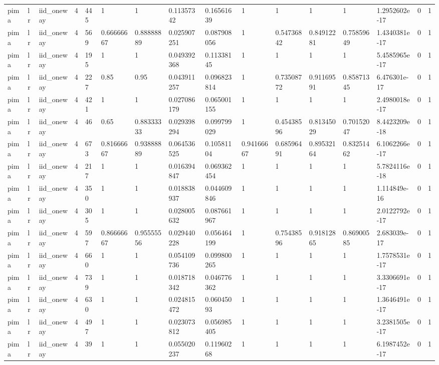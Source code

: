 \begin{tabular}{llllllllllllllll}
pima & lr & iid\_oneway & 4 & 445 & 1 & 1 & 0.11357342 & 0.16561639 & 1 & 1 & 1 & 1 & 1.2952602e-17 & 0 & 1 \\
pima & lr & iid\_oneway & 4 & 569 & 0.66666667 & 0.88888889 & 0.025907251 & 0.087908056 & 1 & 0.54736842 & 0.84912281 & 0.75859649 & 1.4340381e-17 & 0 & 1 \\
pima & lr & iid\_oneway & 4 & 195 & 1 & 1 & 0.049392368 & 0.11338145 & 1 & 1 & 1 & 1 & 5.4585965e-17 & 0 & 1 \\
pima & lr & iid\_oneway & 4 & 227 & 0.85 & 0.95 & 0.043911257 & 0.096823814 & 1 & 0.73508772 & 0.91169591 & 0.85871345 & 6.476301e-17 & 0 & 1 \\
pima & lr & iid\_oneway & 4 & 421 & 1 & 1 & 0.027086179 & 0.065001155 & 1 & 1 & 1 & 1 & 2.4980018e-17 & 0 & 1 \\
pima & lr & iid\_oneway & 4 & 46 & 0.65 & 0.88333333 & 0.029398294 & 0.099799029 & 1 & 0.45438596 & 0.81345029 & 0.70152047 & 8.4423209e-18 & 0 & 1 \\
pima & lr & iid\_oneway & 4 & 673 & 0.81666667 & 0.93888889 & 0.064536525 & 0.10581104 & 0.94166667 & 0.68596491 & 0.89532164 & 0.83251462 & 6.1062266e-17 & 0 & 1 \\
pima & lr & iid\_oneway & 4 & 217 & 1 & 1 & 0.016394847 & 0.069362454 & 1 & 1 & 1 & 1 & 5.7824116e-18 & 0 & 1 \\
pima & lr & iid\_oneway & 4 & 350 & 1 & 1 & 0.018838937 & 0.044609846 & 1 & 1 & 1 & 1 & 1.114849e-16 & 0 & 1 \\
pima & lr & iid\_oneway & 4 & 305 & 1 & 1 & 0.028005632 & 0.087661967 & 1 & 1 & 1 & 1 & 2.0122792e-17 & 0 & 1 \\
pima & lr & iid\_oneway & 4 & 597 & 0.86666667 & 0.95555556 & 0.029440228 & 0.056464199 & 1 & 0.75438596 & 0.91812865 & 0.86900585 & 2.683039e-17 & 0 & 1 \\
pima & lr & iid\_oneway & 4 & 660 & 1 & 1 & 0.054109736 & 0.099800265 & 1 & 1 & 1 & 1 & 1.7578531e-17 & 0 & 1 \\
pima & lr & iid\_oneway & 4 & 739 & 1 & 1 & 0.018718342 & 0.046776362 & 1 & 1 & 1 & 1 & 3.3306691e-17 & 0 & 1 \\
pima & lr & iid\_oneway & 4 & 630 & 1 & 1 & 0.024815472 & 0.06045093 & 1 & 1 & 1 & 1 & 1.3646491e-17 & 0 & 1 \\
pima & lr & iid\_oneway & 4 & 497 & 1 & 1 & 0.023073812 & 0.056985405 & 1 & 1 & 1 & 1 & 3.2381505e-17 & 0 & 1 \\
pima & lr & iid\_oneway & 4 & 39 & 1 & 1 & 0.055020237 & 0.11960268 & 1 & 1 & 1 & 1 & 6.1987452e-17 & 0 & 1 \\

\end{tabular}

